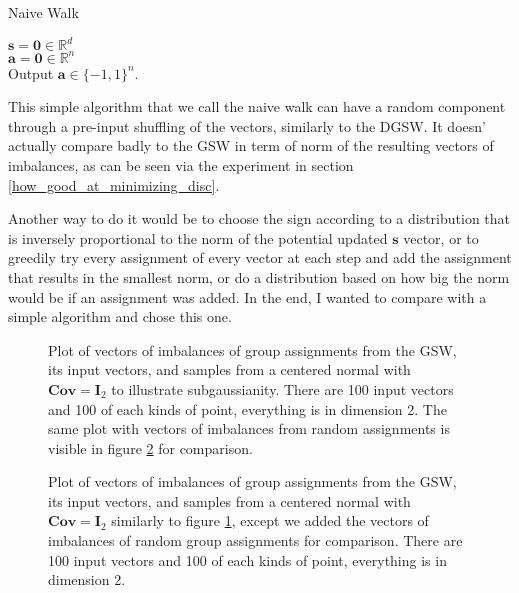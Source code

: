 \documentclass[12pt]{article}
\begin{document}
\begin{algorithm}[H]\label{naivewalk}
{\fontsize{10}{12}
\caption{Naive Walk}
   $\textbf{s}=\textbf{0}\in\mathbb{R}^d$\\
   $\textbf{a}=\textbf{0}\in\mathbb{R}^n$\\
    Output $\textbf{a}\in\{-1,1\}^n$.
    }%
    \end{algorithm}
This simple algorithm that we call the naive walk can have a random component through a pre-input shuffling of the vectors, similarly to the DGSW. It doesn' actually compare badly to the GSW in term of norm of the resulting vectors of imbalances, as can be seen via the experiment in section \ref{how_good_at_minimizing_disc}. 

Another way to do it would be to choose the sign according to a distribution that is inversely proportional to the norm of the potential updated $\textbf{s}$ vector, or to greedily try every assignment of every vector at each step and add the assignment that results in the smallest norm, or do a distribution based on how big the norm would be if an assignment was added. In the end, I wanted to compare with a simple algorithm and chose this one.

\begin{figure}[h!]

\caption{Plot of vectors of imbalances of group assignments from the GSW, its input vectors, and samples from a centered normal with $\textbf{Cov}=\textbf{I}_2$ to illustrate subgaussianity. There are 100 input vectors and 100 of each kinds of point, everything is in dimension 2. The same plot with vectors of imbalances from random assignments is visible in figure \ref{4types_4} for comparison.}
\label{4types_3}
\end{figure}
\begin{figure}[h!]

\caption{Plot of vectors of imbalances of group assignments from the GSW, its input vectors, and samples from a centered normal with $\textbf{Cov}=\textbf{I}_2$ similarly to figure \ref{4types_3}, except we added the vectors of imbalances of random group assignments for comparison. There are 100 input vectors and 100 of each kinds of point, everything is in dimension 2.}
\label{4types_4}
\end{figure}
\end{document}
